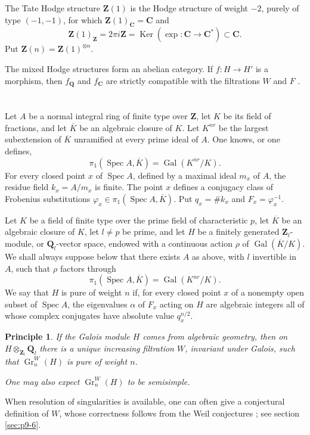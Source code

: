 \documentclass[11pt]{amsart}
\theoremstyle{plain}
\newtheorem{principle}[theorem]{Principle}
\theoremstyle{definition}
\theoremstyle{remark}
\DeclareMathOperator{\Ker}{Ker}
\DeclareMathOperator{\Gr}{Gr}
\DeclareMathOperator{\Spec}{Spec}
\DeclareMathOperator{\Gal}{Gal}
\newcommand{\Q}{\mathbf{Q}}
\newcommand{\Z}{\mathbf{Z}}
\newcommand{\C}{\mathbf{C}}
\begin{document}
The Tate Hodge structure $\Z(1)$ is the Hodge structure of weight $-2$, purely of type $(-1,-1)$, for which $\Z(1)_\C=\C$ and
\[
\Z(1)_\Z=2\pi i\Z=\Ker(\exp:\C\to\C^*)\subset\C.
\]
Put $\Z(n)=\Z(1)^{\otimes n}$.

The mixed Hodge structures form an abelian category. If $f:H\to H'$ is a morphism, then $f_\Q$ and $f_\C$ are strictly compatible with the filtrations $W$ and $F$ \cite[2.3.5]{Hodge2}.

\section{}
Let $A$ be a normal integral ring of finite type over $\Z$, let $K$ be its field of fractions, and let $\overline K$ be an algebraic closure of $K$. Let $K^{nr}$ be the largest subextension of $\overline K$ unramified at every prime ideal of $A$. One knows, or one defines,
\[
\pi_1(\Spec A,\overline K)=\Gal(K^{nr}/K).
\]
For every closed point $x$ of $\Spec A$, defined by a maximal ideal $m_x$ of $A$, the residue field $k_x=A/m_x$ is finite. The point $x$ defines a conjugacy class of Frobenius substitutions $\varphi_x\in \pi_1(\Spec A,\overline K)$. Put $q_x=\#k_x$ and $F_x=\varphi_x^{-1}$.

Let $K$ be a field of finite type over the prime field of characteristic $p$, let $\overline K$ be an algebraic closure of $K$, let $l\neq p$ be prime, and let $H$ be a finitely generated $\Z_l$-module, or $\Q_l$-vector space, endowed with a continuous action $\rho$ of $\Gal(\overline K/K)$. We shall always suppose below that there exists $A$ as above, with $l$ invertible in $A$, such that $\rho$ factors through
\[
\pi_1(\Spec A,\overline K)=\Gal(K^{nr}/K).
\]
We say that $H$ is pure of weight $n$ if, for every closed point $x$ of a nonempty open subset of $\Spec A$, the eigenvalues $\alpha$ of $F_x$ acting on $H$ are algebraic integers all of whose complex conjugates have absolute value $q_x^{n/2}$.

\begin{principle}\label{pr:p9-2.1}
If the Galois module $H$ comes from algebraic geometry, then on $H\otimes_{\Z_l}\Q_l$ there is a unique increasing filtration $W$, invariant under Galois, such that $\Gr_n^W(H)$ is pure of weight $n$.

One may also expect $\Gr_n^W(H)$ to be semisimple.
\end{principle}

When resolution of singularities is available, one can often give a conjectural definition of $W$, whose correctness follows from the Weil conjectures \cite{Weil}; see section \ref{sec:p9-6}.
\end{document}
